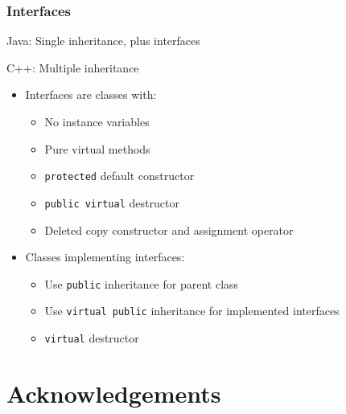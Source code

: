 \documentclass{beamer}
\begin{document}
\begin{frame}[fragile]
  \frametitle{Interfaces}
\begin{block}{Java: Single inheritance, plus interfaces}
\end{block}
\begin{block}{C++: Multiple inheritance}
  \begin{itemize}
  \item Interfaces are classes with:
    \begin{itemize}
      \item No instance variables
      \item Pure virtual methods
      \item \texttt{protected} default constructor
      \item \texttt{public virtual} destructor
      \item Deleted copy constructor and assignment operator
    \end{itemize}
  \item Classes implementing interfaces:
    \begin{itemize}
      \item Use \texttt{public} inheritance for parent class
      \item Use \texttt{virtual public} inheritance for implemented interfaces
      \item \texttt{virtual} destructor
    \end{itemize}
  \end{itemize}
\end{block}
\end{frame}

\section*{Acknowledgements}
\end{document}
